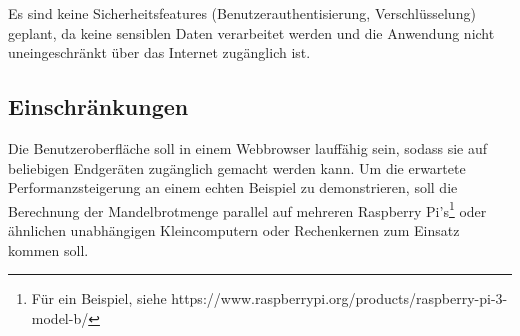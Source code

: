Es sind keine Sicherheitsfeatures (Benutzerauthentisierung, Verschlüsselung) geplant, da keine sensiblen Daten verarbeitet werden und die Anwendung nicht uneingeschränkt über das Internet zugänglich ist.

\subsection{Einschränkungen}

Die Benutzeroberfläche soll in einem Webbrowser lauffähig sein, sodass sie auf beliebigen Endgeräten
zugänglich gemacht werden kann.
Um die erwartete Performanzsteigerung an einem echten Beispiel zu demonstrieren,
soll die Berechnung der Mandelbrotmenge parallel auf mehreren Raspberry Pi’s\footnote{Für ein Beispiel, siehe https://www.raspberrypi.org/products/raspberry-pi-3-model-b/} oder ähnlichen unabhängigen Kleincomputern oder Rechenkernen zum Einsatz kommen soll.

